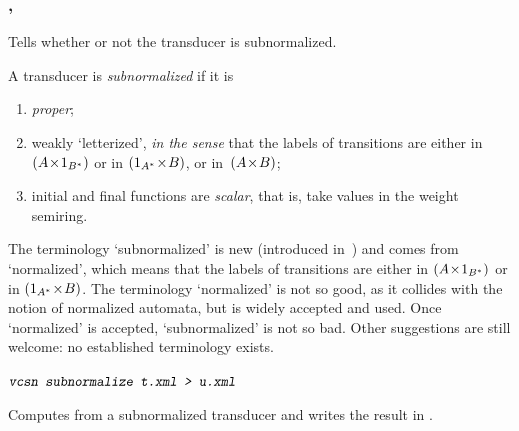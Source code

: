 \shortclear 
\subsubsection{, }

\begin{SwClCmd}
%
\end{SwClCmd}%
\begin{SwClTxt}
    Tells whether or not the transducer 
        is subnormalized.
\end{SwClTxt}%

\Spec
A transducer is \emph{subnormalized} if it is
\begin{enumerate}
    \item  \emph{proper};

    \item  weakly `letterized', \emph{in the sense} that the labels of 
transitions are either in $(A \! \times \! {1_{{{B}^{*}}}})$ or in $({1_{{{A}^{*}}}} \! \times \! B)$, or 
in~$(A\! \times \! B)$;

    \item  initial and final functions are \emph{scalar}, that is, take values in the weight semiring.
\end{enumerate}

\Comt 
The terminology `subnormalized' is new (introduced 
in~\cite{ClavEtAl05}) and comes from `normalized',
%
%
which means that the labels of 
transitions are either in $(A \! \times \! {1_{{{B}^{*}}}})$ or in $({1_{{{A}^{*}}}} \! \times \! B)$.
The terminology `normalized' is not so good, as it collides with the 
notion of normalized automata, but is widely accepted and used.
Once `normalized' is accepted, `subnormalized' is not so bad. 
Other suggestions are still welcome: no established 
terminology exists. 


\medskip
\begin{SwClCmd}
\begin{shell}
$ 
$
\end{shell}%
\end{SwClCmd}%
\begin{SwClTxt}
    Computes from  a subnormalized transducer 
    and writes the result in .
\end{SwClTxt}%


